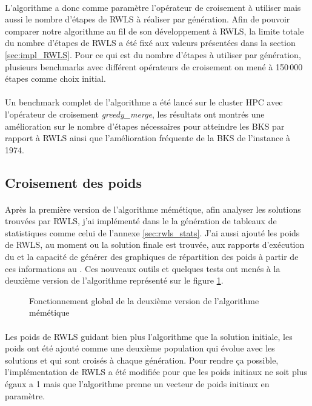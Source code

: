 \documentclass[a4paper,11pt,twoside,french,report]{../common/simplem}
\begin{document}
				\paragraph*{}
					L'algorithme a donc comme paramètre l'opérateur de croisement à utiliser mais aussi le nombre d'étapes de \gls{RWLS} à réaliser par génération. Afin de pouvoir comparer notre algorithme au fil de son développement à \gls{RWLS}, la limite totale du nombre d'étapes de \gls{RWLS} a été fixé aux valeurs présentées dans la section \ref{sec:impl_RWLS}. Pour ce qui est du nombre d'étapes à utiliser par génération, plusieurs benchmarks avec différent opérateurs de croisement on mené à 150\,000 étapes comme choix initial.
				\paragraph*{}
					Un benchmark complet de l'algorithme a été lancé sur le cluster \gls{HPC} avec l'opérateur de croisement \textit{greedy\_merge}, les résultats ont montrés une amélioration sur le nombre d'étapes nécessaires pour atteindre les \gls{BKS} par rapport à \gls{RWLS} ainsi que l'amélioration fréquente de la \gls{BKS} de l'instance  à 1974.
			\subsection{Croisement des poids}
				\paragraph*{}
					Après la première version de l'algorithme mémétique, afin analyser les solutions trouvées par \gls{RWLS}, j'ai implémenté dans le \printer{} la génération de tableaux de statistiques comme celui de l'annexe \ref{sec:rwls_stats}. J'ai aussi ajouté les poids de \gls{RWLS}, au moment ou la solution finale est trouvée, aux rapports d'exécution du \solver{} et la capacité de générer des graphiques de répartition des poids à partir de ces informations au \printer{}. Ces nouveaux outils et quelques tests ont menés à la deuxième version de l'algorithme représenté sur le figure \ref{fig:memetic_algorithm_v2}.
				\begin{figure}[H]
					\centering%
					\caption{Fonctionnement global de la deuxième version de l'algorithme mémétique}%
					\label{fig:memetic_algorithm_v2}%
				\end{figure}
				\paragraph*{}
					Les poids de \gls{RWLS} guidant bien plus l'algorithme que la solution initiale, les poids ont été ajouté comme une deuxième population qui évolue avec les solutions et qui sont croisés à chaque génération. Pour rendre ça possible, l'implémentation de \gls{RWLS} a été modifiée pour que les poids initiaux ne soit plus égaux a 1 mais que l'algorithme prenne un vecteur de poids initiaux en paramètre.
\end{document}

